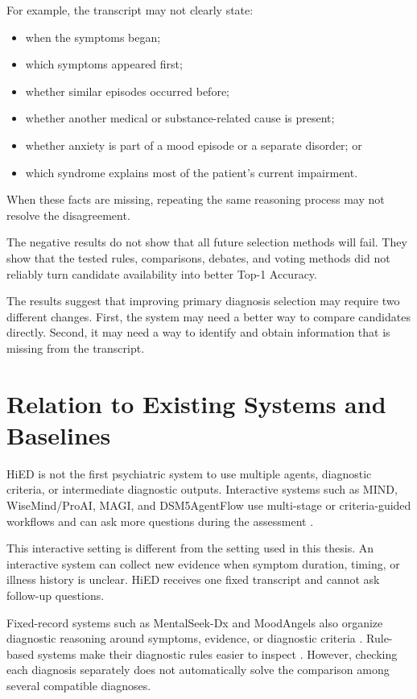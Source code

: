 \documentclass[12pt,a4paper,oneside]{report}
\begin{document}
For example, the transcript may not clearly state:

\begin{itemize}
    \item when the symptoms began;
    \item which symptoms appeared first;
    \item whether similar episodes occurred before;
    \item whether another medical or substance-related cause is present;
    \item whether anxiety is part of a mood episode or a separate
    disorder; or
    \item which syndrome explains most of the patient's current
    impairment.
\end{itemize}

When these facts are missing, repeating the same reasoning process may
not resolve the disagreement.

The negative results do not show that all future selection methods will
fail. They show that the tested rules, comparisons, debates, and voting
methods did not reliably turn candidate availability into better Top-1
Accuracy.

The results suggest that improving primary diagnosis selection may
require two different changes. First, the system may need a better way
to compare candidates directly. Second, it may need a way to identify
and obtain information that is missing from the transcript.

\section{Relation to Existing Systems and Baselines}
\label{sec:discussion-related-systems}

HiED is not the first psychiatric system to use multiple agents,
diagnostic criteria, or intermediate diagnostic outputs. Interactive
systems such as MIND, WiseMind/ProAI, MAGI, and DSM5AgentFlow use
multi-stage or criteria-guided workflows and can ask more questions
during the assessment
\citep{li2026mind,wu2026wisemind,bi2025magi,ozgun2025dsm5agentflow}.

This interactive setting is different from the setting used in this
thesis. An interactive system can collect new evidence when symptom
duration, timing, or illness history is unclear. HiED receives one fixed
transcript and cannot ask follow-up questions.

Fixed-record systems such as MentalSeek-Dx and MoodAngels also organize
diagnostic reasoning around symptoms, evidence, or diagnostic criteria
\citep{sun2026mentalseek,xiao2025moodangels}. Rule-based systems make
their diagnostic rules easier to inspect
\citep{kim2025clp}. However, checking each diagnosis separately does not
automatically solve the comparison among several compatible diagnoses.
\end{document}
